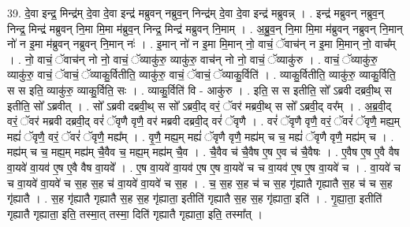 \documentclass[17pt]{extarticle}
\begin{document}
39. दे॒वा इन्द्र॒ मिन्द्र॑म् दे॒वा दे॒वा इन्द्र॑ मब्रुवन् नब्रुव॒न् निन्द्र॑म् दे॒वा दे॒वा इन्द्र॑ मब्रुवन्न् । . इन्द्र॑ मब्रुवन् नब्रुव॒न् निन्द्र॒ मिन्द्र॑ मब्रुवन् नि॒मा मि॒मा म॑ब्रुव॒न् निन्द्र॒ मिन्द्र॑ मब्रुवन् नि॒माम् । . अ॒ब्रु॒व॒न् नि॒मा मि॒मा म॑ब्रुवन् नब्रुवन् नि॒मान् नो॑ न इ॒मा म॑ब्रुवन् नब्रुवन् नि॒मान् नः॑ । . इ॒मान् नो॑ न इ॒मा मि॒मान् नो॒ वाचं॒ ॅवाच॑न् न इ॒मा मि॒मान् नो॒ वाच᳚म् । . नो॒ वाचं॒ ॅवाच॑न् नो नो॒ वाचं॒ ॅव्याकु॑रु॒ व्याकु॑रु॒ वाच॑न् नो नो॒ वाचं॒ ॅव्याकु॑रु । . वाचं॒ ॅव्याकु॑रु॒ व्याकु॑रु॒ वाचं॒ ॅवाचं॒ ॅव्याकु॒र्वितीति॒ व्याकु॑रु॒ वाचं॒ ॅवाचं॒ ॅव्याकु॒र्विति॑ । . व्याकु॒र्वितीति॒ व्याकु॑रु॒ व्याकु॒र्विति॒ स स इति॒ व्याकु॑रु॒ व्याकु॒र्विति॒ सः । . व्याकु॒र्विति॑ वि - आकु॑रु । . इति॒ स स इतीति॒ सो᳚ ऽब्रवी दब्रवी॒थ् स इतीति॒ सो᳚ ऽब्रवीत् । . सो᳚ ऽब्रवी दब्रवी॒थ् स सो᳚ ऽब्रवी॒द् वरं॒ ॅवर॑ मब्रवी॒थ् स सो᳚ ऽब्रवी॒द् वर᳚म् । . अ॒ब्र॒वी॒द् वरं॒ ॅवर॑ मब्रवी दब्रवी॒द् वरं॑ ॅवृणै वृणै॒ वर॑ मब्रवी दब्रवी॒द् वरं॑ ॅवृणै । . वरं॑ ॅवृणै वृणै॒ वरं॒ ॅवरं॑ ॅवृणै॒ मह्य॒म् मह्यं॑ ॅवृणै॒ वरं॒ ॅवरं॑ ॅवृणै॒ मह्य᳚म् । . वृ॒णै॒ मह्य॒म् मह्यं॑ ॅवृणै वृणै॒ मह्य॑म् च च॒ मह्यं॑ ॅवृणै वृणै॒ मह्य॑म् च । . मह्य॑म् च च॒ मह्य॒म् मह्य॑म् चै॒वैव च॒ मह्य॒म् मह्य॑म् चै॒व । . चै॒वैव च॑ चै॒वैष ए॒ष ए॒व च॑ चै॒वैषः । . ए॒वैष ए॒ष ए॒वै वैष वा॒यवे॑ वा॒यव॑ ए॒ष ए॒वै वैष वा॒यवे᳚ । . ए॒ष वा॒यवे॑ वा॒यव॑ ए॒ष ए॒ष वा॒यवे॑ च च वा॒यव॑ ए॒ष ए॒ष वा॒यवे॑ च । . वा॒यवे॑ च च वा॒यवे॑ वा॒यवे॑ च स॒ह स॒ह च॑ वा॒यवे॑ वा॒यवे॑ च स॒ह । . च॒ स॒ह स॒ह च॑ च स॒ह गृ॑ह्यातै गृह्यातै स॒ह च॑ च स॒ह गृ॑ह्यातै । . स॒ह गृ॑ह्यातै गृह्यातै स॒ह स॒ह गृ॑ह्याता॒ इतीति॑ गृह्यातै स॒ह स॒ह गृ॑ह्याता॒ इति॑ । . गृ॒ह्या॒ता॒ इतीति॑ गृह्यातै गृह्याता॒ इति॒ तस्मा॒त् तस्मा॒ दिति॑ गृह्यातै गृह्याता॒ इति॒ तस्मा᳚त् । \newline
\end{document}
